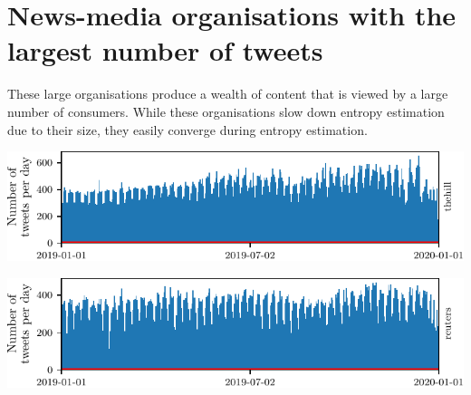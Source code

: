 











\section{News-media organisations with the largest number of tweets}

These large organisations produce a wealth of content that is viewed by a large number of consumers. While these organisations slow down entropy estimation due to their size, they easily converge during entropy estimation.


\begin{center}

\includegraphics{appendix2/figs/tweet_times/thehill.pdf}
\end{center}

\begin{center}

\includegraphics{appendix2/figs/tweet_times/reuters.pdf}
\end{center}


